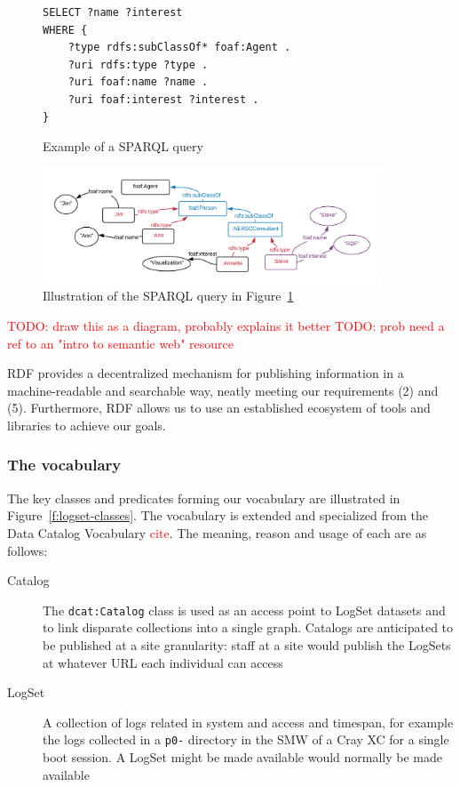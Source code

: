 \begin{figure}[H]
\begin{verbatim}
SELECT ?name ?interest 
WHERE {    
    ?type rdfs:subClassOf* foaf:Agent .
    ?uri rdfs:type ?type .
    ?uri foaf:name ?name .
    ?uri foaf:interest ?interest .
}
\end{verbatim}
\caption{Example of a SPARQL query}
\label{f:sparql}
\end{figure}


\begin{figure}
\includegraphics[width=0.9\textwidth]{sparql.png}
\caption{Illustration of the SPARQL query in Figure~\ref{f:sparql} }
\label{f:sparql-diagram}
\end{figure}

\textcolor{red}{TODO: draw this as a diagram, probably explains it better}
\textcolor{red}{TODO: prob need a ref to an "intro to semantic web" resource}

RDF provides a decentralized mechanism for publishing information in a
machine-readable and searchable way, neatly meeting our requirements
(2) and (5). Furthermore, RDF allows us to use an established ecosystem of 
tools and libraries to achieve our goals.

\subsubsection{The vocabulary}

The key classes and predicates forming our vocabulary are illustrated in Figure~\ref{f:logset-classes}. The vocabulary is extended and specialized from the Data Catalog Vocabulary \textcolor{red}{cite}. The meaning, reason and usage of each are as follows:

\begin{description}
\item[Catalog] 
The \texttt{dcat:Catalog} class is used as an access point to LogSet datasets and 
to link disparate collections into a single graph. Catalogs are anticipated to be 
published at a site granularity: staff at a site would publish the LogSets 
at whatever URL each individual can access 
\item[LogSet] 
A collection of logs related in system and access and timespan,
for example the logs collected in a \texttt{p0-} directory in the SMW of a Cray
XC for a single boot session. A LogSet might be made available would normally be made available 

\end{description}


